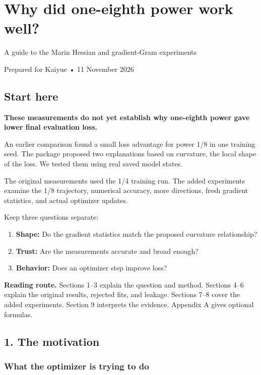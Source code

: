 \documentclass[
  14pt,
  letterpaper,
]{extarticle}
\author{}
\date{}
\providecommand{\tightlist}{%
  \setlength{\itemsep}{0pt}\setlength{\parskip}{0pt}}
\let\reportsection\section
\renewcommand{\section}{\Needspace{9\baselineskip}\reportsection}
\begin{document}
\section{Why did one-eighth power work
well?}\label{why-did-one-eighth-power-work-well}

A guide to the Marin Hessian and gradient-Gram experiments

Prepared for Kaiyue • 11 November 2026

\subsection{Start here}\label{start-here}

\textbf{These measurements do not yet establish why one-eighth power
gave lower final evaluation loss.}

An earlier comparison found a small loss advantage for power 1/8 in one
training seed. The package proposed two explanations based on curvature,
the local shape of the loss. We tested them using real saved model
states.

The original measurements used the 1/4 training run. The added
experiments examine the 1/8 trajectory, numerical accuracy, more
directions, fresh gradient statistics, and actual optimizer updates.

Keep three questions separate:

\begin{enumerate}
\def\labelenumi{\arabic{enumi}.}
\tightlist
\item
  \textbf{Shape:} Do the gradient statistics match the proposed
  curvature relationship?
\item
  \textbf{Trust:} Are the measurements accurate and broad enough?
\item
  \textbf{Behavior:} Does an optimizer step improve loss?
\end{enumerate}

\textbf{Reading route.} Sections 1--3 explain the question and method.
Sections 4--6 explain the original results, rejected fits, and leakage.
Sections 7--8 cover the added experiments. Section 9 interprets the
evidence. Appendix A gives optional formulas.

\subsection{1. The motivation}\label{the-motivation}

\subsubsection{What the optimizer is trying to
do}\label{what-the-optimizer-is-trying-to-do}
\end{document}

